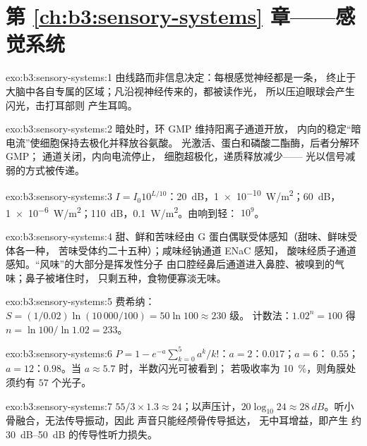 \section*{第 \ref{ch:b3:sensory-systems} 章——感觉系统}

\begin{solution}{exo:b3:sensory-systems:1}
由线路而非信息决定：每根感觉神经都是一条，
终止于大脑中各自专属的区域；凡沿视神经传来的，都被读作光，
所以压迫眼球会产生闪光，击打耳部则
产生耳鸣。
\end{solution}

\begin{solution}{exo:b3:sensory-systems:2}
暗处时，环 GMP 维持阳离子通道开放，
内向的稳定“暗电流”使细胞保持去极化并释放谷氨酸。
光激活、蛋白和磷酸二酯酶，后者分解环 GMP；
通道关闭，内向电流停止，
细胞超极化，递质释放减少——
光以信号减弱的方式被传递。
\end{solution}

\begin{solution}{exo:b3:sensory-systems:3}
$I = I_{0}10^{L/10}$：\qty{20}{dB}，\qty{1e-10}{W/m^2}；\qty{60}{dB}，
\qty{1e-6}{W/m^2}；\qty{110}{dB}，\qty{0.1}{W/m^2}。由响到轻：
$10^{9}$。
\end{solution}

\begin{solution}{exo:b3:sensory-systems:4}
甜、鲜和苦味经由 G 蛋白偶联受体感知（甜味、鲜味受体各一种，
苦味受体约二十五种）；咸味经钠通道 ENaC 感知，
酸味经质子通道感知。“风味”的大部分是挥发性分子
由口腔经鼻后通道进入鼻腔、被嗅到的气味；鼻子被堵住时，
只剩五种，食物便寡淡无味。
\end{solution}

\begin{solution}{exo:b3:sensory-systems:5}
费希纳：$S = (1/0.02)\ln(10\,000/100) = 50\ln 100 \approx 230$ 级。
计数法：$1.02^{n} = 100$ 得 $n = \ln 100/\ln 1.02 = 233$。
\end{solution}

\begin{solution}{exo:b3:sensory-systems:6}
$P = 1 - e^{-a}\sum_{k=0}^{5}a^{k}/k!$：$a = 2$：$0.017$；$a = 6$：
$0.55$；$a = 12$：$0.98$。当 $a \approx 5.7$ 时，半数闪光可被看到；
若吸收率为 \qty{10}{\%}，则角膜处须约有 $57$
个光子。
\end{solution}

\begin{solution}{exo:b3:sensory-systems:7}
$55/3\times 1.3 \approx 24$；以声压计，$20\log_{10}24
\approx \qty{28}{dB}$。听小骨融合，无法传导振动，因此
声音只能经颅骨传导抵达，
无中耳增益，即产生
约 \qtyrange{30}{50}{dB} 的传导性听力损失。
\end{solution}

